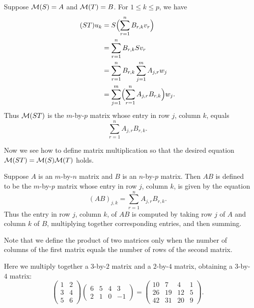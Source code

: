 Suppose $\mathcal{M}(S)=A$ and $\mathcal{M}(T)=B$. For $1\le k\le p$, we have
\begin{align*}
(ST)u_k &= S\Bigl(\sum_{r=1}^n B_{r,k}v_r\Bigr)\\
        &= \sum_{r=1}^n B_{r,k}Sv_r\\
        &= \sum_{r=1}^n B_{r,k}\sum_{j=1}^m A_{j,r}w_j\\
        &= \sum_{j=1}^m\Bigl(\sum_{r=1}^n A_{j,r}B_{r,k}\Bigr)w_j.
\end{align*}
Thus $\mathcal{M}(ST)$ is the $m$-by-$p$ matrix whose entry in row $j$, column $k$,
equals
\[ \sum_{r=1}^n A_{j,r}B_{r,k}. \]

Now we see how to define matrix multiplication so that the desired equation
$\mathcal{M}(ST)=\mathcal{M}(S)\mathcal{M}(T)$ holds.

\begin{definition}\label{ax:3.41}
Suppose $A$ is an $m$-by-$n$ matrix and $B$ is an $n$-by-$p$ matrix. Then $AB$
is defined to be the $m$-by-$p$ matrix whose entry in row $j$, column $k$, is
given by the equation
\[ (AB)_{j,k} = \sum_{r=1}^n A_{j,r}B_{r,k}. \]
Thus the entry in row $j$, column $k$, of $AB$ is computed by taking row $j$ of
$A$ and column $k$ of $B$, multiplying together corresponding entries, and then
summing.
\end{definition}

%
Note that we define the product of two matrices only when the number of columns
of the first matrix equals the number of rows of the second matrix.

\begin{example}\label{ax:3.42}
Here we multiply together a $3$-by-$2$ matrix and a $2$-by-$4$ matrix,
obtaining a $3$-by-$4$ matrix:
\[ \begin{pmatrix} 1 & 2\\ 3 & 4\\ 5 & 6 \end{pmatrix}
   \begin{pmatrix} 6 & 5 & 4 & 3\\ 2 & 1 & 0 & -1 \end{pmatrix}
 = \begin{pmatrix} 10 & 7 & 4 & 1\\ 26 & 19 & 12 & 5\\ 42 & 31 & 20 & 9
   \end{pmatrix}. \]
\end{example}

